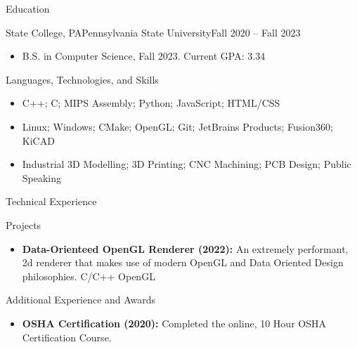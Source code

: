 \documentclass[]{cv}
\begin{document}
	
	\makeheader
	
	\begin{cvsection}{Education}
		\begin{cvsubsection}{State College, PA}{Pennsylvania State University}{Fall 2020 -- Fall 2023}
			\begin{itemize}
				\item B.S. in Computer Science, Fall 2023.   \hfill Current GPA: 3.34
			\end{itemize}
		\end{cvsubsection}
	\end{cvsection}

	\begin{cvsection}{Languages, Technologies, and Skills}
		\begin{cvsubsection}{}{}{}	
			\begin{itemize}
				\item C++; C; MIPS Assembly; Python; JavaScript; HTML/CSS
				\item Linux; Windows; CMake; OpenGL; Git; JetBrains Products; Fusion360; KiCAD
				\item Industrial 3D Modelling; 3D Printing; CNC Machining; PCB Design; Public Speaking
			\end{itemize}
		\end{cvsubsection}
	\end{cvsection}

	\begin{cvsection}{Technical Experience}
		\begin{cvsubsection}{Projects}{}{}
			\begin{itemize}
				\item \textbf{Data-Orienteed OpenGL Renderer (2022):}  An extremely performant, 2d renderer that makes use of modern OpenGL and Data Oriented Design philosophies.  C/C++ OpenGL
			\end{itemize}
		\end{cvsubsection}
	\end{cvsection}
	
	\begin{cvsection}{Additional Experience and Awards}
		\begin{cvsubsection}{}{}{}	
			\begin{itemize}
				\item \textbf{OSHA Certification (2020):} Completed the online, 10 Hour OSHA Certification Course.
			\end{itemize}
		\end{cvsubsection}
	\end{cvsection}
\end{document}
